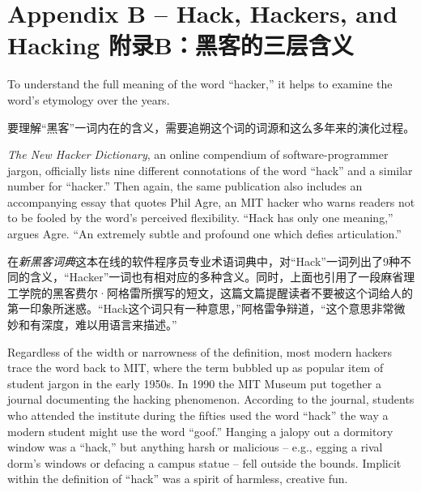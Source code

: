 

\chapter{\ifdefined\eng
Appendix B -- Hack, Hackers, and Hacking
\fi
\ifdefined\chs
附录B：黑客的三层含义
\fi} \label{Appendix B}

\ifdefined\eng
To understand the full meaning of the word ``hacker,'' it helps to examine the word's etymology over the years.
\fi

\ifdefined\chs
要理解``黑客''一词内在的含义，需要追朔这个词的词源和这么多年来的演化过程。
\fi

\ifdefined\eng
\textit{The New Hacker Dictionary}, an online compendium of software-programmer jargon, officially lists nine different connotations of the word ``hack'' and a similar number for ``hacker.'' Then again, the same publication also includes an accompanying essay that quotes Phil Agre, an MIT hacker who warns readers not to be fooled by the word's perceived flexibility. ``Hack has only one meaning,'' argues Agre. ``An extremely subtle and profound one which defies articulation.''  %
\fi

\ifdefined\chs
在\textit{新黑客词典}这本在线的软件程序员专业术语词典中，对``Hack''一词列出了9种不同的含义，``Hacker''一词也有相对应的多种含义。同时，上面也引用了一段麻省理工学院的黑客费尔·阿格雷所撰写的短文，这篇文篇提醒读者不要被这个词给人的第一印象所迷惑。``Hack这个词只有一种意思，''阿格雷争辩道，``这个意思非常微妙和有深度，难以用语言来描述。'' %
\fi

\ifdefined\eng
Regardless of the width or narrowness of the definition, most modern hackers trace the word back to MIT, where the term bubbled up as popular item of student jargon in the early 1950s. In 1990 the MIT Museum put together a journal documenting the hacking phenomenon. According to the journal, students who attended the institute during the fifties used the word ``hack'' the way a modern student might use the word ``goof.'' Hanging a jalopy out a dormitory window was a ``hack,'' but anything harsh or malicious -- e.g., egging a rival dorm's windows or defacing a campus statue -- fell outside the bounds. Implicit within the definition of ``hack'' was a spirit of harmless, creative fun.
\fi

